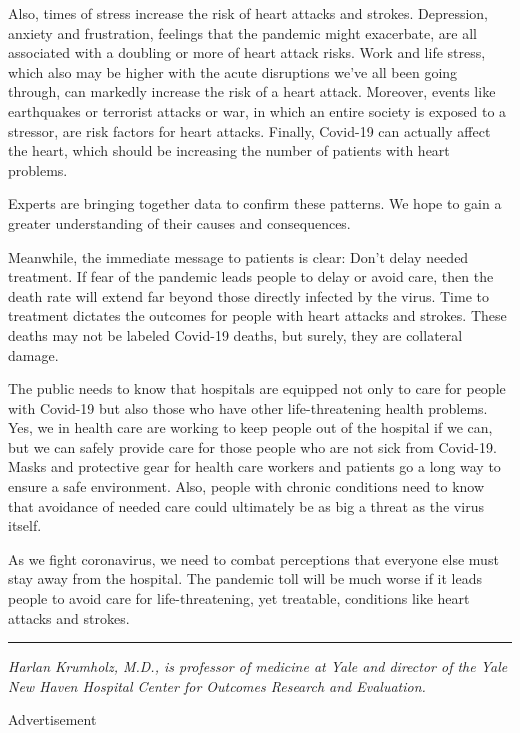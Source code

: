 Also, times of stress increase the risk of heart attacks and strokes.
Depression, anxiety and frustration, feelings that the pandemic might
exacerbate, are all associated with a doubling or more of heart attack
risks. Work and life stress, which also may be higher with the acute
disruptions we've all been going through, can markedly increase the risk
of a heart attack. Moreover, events like earthquakes or terrorist
attacks or war, in which an entire society is exposed to a stressor, are
risk factors for heart attacks. Finally, Covid-19 can actually affect
the heart, which should be increasing the number of patients with heart
problems.

Experts are bringing together data to confirm these patterns. We hope to
gain a greater understanding of their causes and consequences.

Meanwhile, the immediate message to patients is clear: Don't delay
needed treatment. If fear of the pandemic leads people to delay or avoid
care, then the death rate will extend far beyond those directly infected
by the virus. Time to treatment dictates the outcomes for people with
heart attacks and strokes. These deaths may not be labeled Covid-19
deaths, but surely, they are collateral damage.

The public needs to know that hospitals are equipped not only to care
for people with Covid-19 but also those who have other life-threatening
health problems. Yes, we in health care are working to keep people out
of the hospital if we can, but we can safely provide care for those
people who are not sick from Covid-19. Masks and protective gear for
health care workers and patients go a long way to ensure a safe
environment. Also, people with chronic conditions need to know that
avoidance of needed care could ultimately be as big a threat as the
virus itself.

As we fight coronavirus, we need to combat perceptions that everyone
else must stay away from the hospital. The pandemic toll will be much
worse if it leads people to avoid care for life-threatening, yet
treatable, conditions like heart attacks and strokes.

\begin{center}\rule{0.5\linewidth}{\linethickness}\end{center}

\emph{Harlan Krumholz, M.D., is professor of medicine at Yale and
director of the Yale New Haven Hospital Center for Outcomes Research and
Evaluation.}

Advertisement

